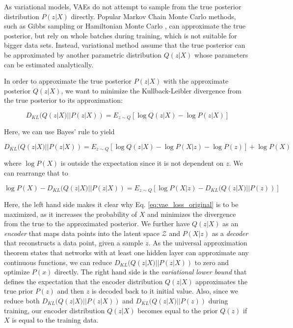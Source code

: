 \documentclass[6pt]{article}
\begin{document}
As variational models, VAEs do not attempt to sample from the true posterior distribution $P(z|X)$ directly. Popular Markov Chain Monte Carlo methods, such as Gibbs sampling \citep{geman1984stochastic} or Hamiltonian Monte Carlo \citep{duane1987hybrid}, can approximate the true posterior, but rely on whole batches during training, which is not suitable for bigger data sets. Instead, variational method assume that the true posterior can be approximated by another parametric distribution $Q(z|X)$ whose parameters can be estimated analytically. 

In order to approximate the true posterior  $P(z|X)$ with the approximate posterior $Q(z|X)$, we want to minimize the Kullback-Leibler divergence from the true posterior to its approximation: 

\begin{equation}
D_{KL}(Q(z|X)||P(z|X)) = E_{z\sim Q}[\log Q(z|X) - \log P(z|X)]
\end{equation}

Here, we can use Bayes' rule to yield 

\begin{equation}
D_{KL}(Q(z|X)||P(z|X)) = E_{z\sim Q}[\log Q(z|X) - \log P(X|z)-\log P(z)] + \log P(X)
\end{equation}

where $\log P(X)$ is outside the expectation since it is not dependent on $z$. We can rearrange that to 

\begin{equation}
\label{eq:vae_loss_original}
\log P(X) - D_{KL}(Q(z|X)||P(z|X)) = E_{z\sim Q}[\log P(X|z) - D_{KL}(Q(z|X)||P(z))] 
\end{equation}



Here, the left hand side makes it clear why Eq. \ref{eq:vae_loss_original} is to be maximized, as it increases the probability of $X$ and minimizes the divergence from the true to the approximated posterior. We further have $Q(z|X)$ as an \textit{encoder} that maps data points into the latent space $\mathcal{Z}$ and $P(X|z)$ as a \textit{decoder} that reconstructs a data point, given a sample $z$. As the universal approximation theorem states that networks with at least one hidden layer can approximate any continuous functions, we can reduce $D_{KL}(Q(z|X)||P(z|X))$ to zero and optimize $P(x)$ directly. The right hand side is the \textit{variational lower bound} that defines the expectation that the encoder distribution $Q(z|X)$ approximates the true prior $P(z)$ and then $z$ is decoded back to it initial value. Also, since we reduce both $D_{KL}(Q(z|X)||P(z|X))$ and $D_{KL}(Q(z|X)||P(z))$ during training, our encoder distribution $Q(z|X)$ becomes equal to the prior $Q(z)$  if $X$ is equal to the training data.
\end{document}

